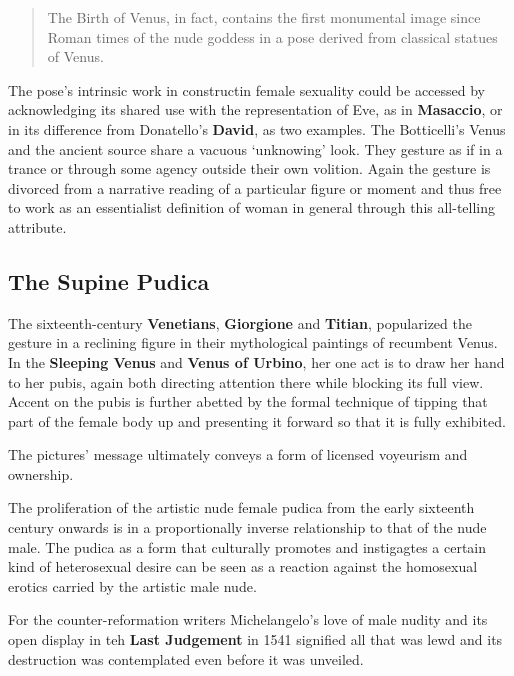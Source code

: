 \begin{quotation}
    The Birth of Venus, in fact, contains the first monumental image since Roman times of the nude goddess in a pose derived from classical statues of Venus.
\end{quotation}

The pose's intrinsic work in constructin female sexuality could be accessed by acknowledging its shared use with the representation of Eve, as in \textbf{Masaccio}, or in its difference from Donatello's \textbf{David}, as two examples. The Botticelli's Venus and the ancient source share a vacuous `unknowing' look. They gesture as if in a trance or through some agency outside their own volition. Again the gesture is divorced from a narrative reading of a particular figure or moment and thus free to work as an essentialist definition of woman in general through this all-telling attribute.

\subsection{The Supine Pudica}

The sixteenth-century \textbf{Venetians}, \textbf{Giorgione} and \textbf{Titian}, popularized the gesture in a reclining figure in their mythological paintings of recumbent Venus. In the \textbf{Sleeping Venus} and \textbf{Venus of Urbino}, her one act is to draw her hand to her pubis, again both directing attention there while blocking its full view. Accent on the pubis is further abetted by the formal technique of tipping that part of the female body up and presenting it forward so that it is fully exhibited.

\begin{rmk}
    The pictures' message ultimately conveys a form of licensed voyeurism and ownership.
\end{rmk}

The proliferation of the artistic nude female pudica from the early sixteenth century onwards is in a proportionally inverse relationship to that of the nude male. The pudica as a form that culturally promotes and instigagtes a certain kind of heterosexual desire can be seen as a reaction against the homosexual erotics carried by the artistic male nude.

For the counter-reformation writers Michelangelo's love of male nudity and its open display in teh \textbf{Last Judgement} in 1541 signified all that was lewd and its destruction was contemplated even before it was unveiled.


